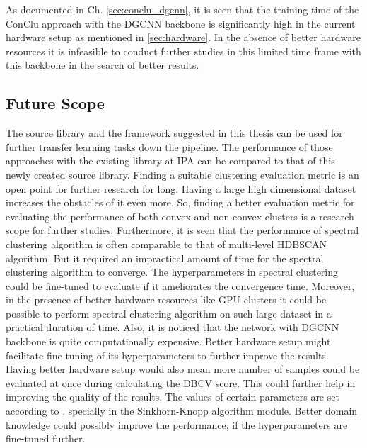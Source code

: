 \vspace{5mm}
As documented in Ch. \ref{sec:conclu_dgcnn}, it is seen that the training time of the ConClu approach with the \ac{DGCNN} backbone is significantly high in the current hardware setup as mentioned in \ref{sec:hardware}. In the absence of better hardware resources it is infeasible to conduct further studies in this limited time frame with this backbone in the search of better results. 

\subsection{Future Scope}

The source library and the framework suggested in this thesis can be used for further transfer learning tasks down the pipeline. The performance of those approaches with the existing library at \ac{IPA} can be compared to that of this newly created source library. Finding a suitable clustering evaluation metric is an open point for further research for long. Having a large high dimensional dataset increases the obstacles of it even more. So, finding a better evaluation metric for evaluating the performance of both convex and non-convex clusters is a research scope for further studies. Furthermore, it is seen that the performance of spectral clustering algorithm is often comparable to that of multi-level \ac{HDBSCAN} algorithm. But it required an impractical amount of time for the spectral clustering algorithm to converge. The hyperparameters in spectral clustering could be fine-tuned to evaluate if it ameliorates the convergence time. Moreover, in the presence of better hardware resources like \ac{GPU} clusters it could be possible to perform spectral clustering algorithm on such large dataset in a practical duration of time. Also, it is noticed that the network with \ac{DGCNN} backbone is quite computationally expensive. Better hardware setup might facilitate fine-tuning of its hyperparameters to further improve the results. Having better hardware setup would also mean more number of samples could be evaluated at once during calculating the \ac{DBCV} score. This could further help in improving the quality of the results. The values of certain parameters are set according to \cite{mei2022unsupervised}, specially in the  Sinkhorn-Knopp algorithm module. Better domain knowledge could possibly improve the performance, if the hyperparameters are fine-tuned further. 